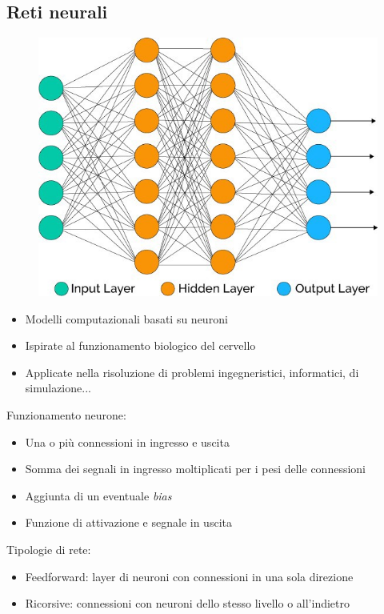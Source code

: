 \documentclass[xcolor=x11names,compress, 
					handout %
]{beamer}
\theoremstyle{definition} \newtheorem{esempio}{Esempio}
\theoremstyle{definition}
\begin{document}
	\subsection{Reti neurali}
		\begin{frame}{\subsecname}
			\begin{figure}
				\includegraphics[scale=0.3]{immagini/linear}
			\end{figure}
			\begin{itemize}
				\item Modelli computazionali basati su neuroni
				\item Ispirate al funzionamento biologico del cervello
				\item Applicate nella risoluzione di problemi ingegneristici, informatici, di simulazione...
			\end{itemize}
		\end{frame}
		
		\begin{frame}{\subsecname}
			Funzionamento neurone:
			\begin{itemize}
				\item Una o più connessioni in ingresso e uscita
				\item Somma dei segnali in ingresso moltiplicati per i pesi delle connessioni
				\item Aggiunta di un eventuale \textit{bias}
				\item Funzione di attivazione e segnale in uscita
			\end{itemize}
			
			Tipologie di rete:
			\begin{itemize}
				\item Feedforward: layer di neuroni con connessioni in una sola direzione
				\item Ricorsive: connessioni con neuroni dello stesso livello o all'indietro
			\end{itemize}
		\end{frame}
		
\end{document}
